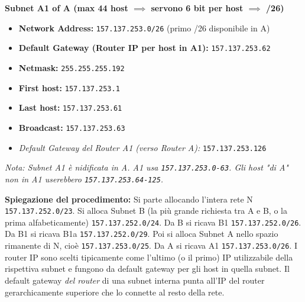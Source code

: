 \documentclass[12pt,a4paper]{article}
\newcommand{\TT}[1]{\texttt{#1}}
\begin{document}
\begin{enumerate}[label=\textbf{\arabic*.}, wide, labelindent=0pt, leftmargin=*]
    \textbf{Subnet A1 of A (max 44 host $\implies$ servono 6 bit per host $\implies$ /26)}
    \begin{itemize}[label=\textbullet]
        \item \textbf{Network Address:} \TT{157.137.253.0/26} (primo /26 disponibile in A)
        \item \textbf{Default Gateway (Router IP per host in A1):} \TT{157.137.253.62}
        \item \textbf{Netmask:} \TT{255.255.255.192}
        \item \textbf{First host:} \TT{157.137.253.1}
        \item \textbf{Last host:} \TT{157.137.253.61}
        \item \textbf{Broadcast:} \TT{157.137.253.63}
        \item \textit{Default Gateway del Router A1 (verso Router A):} \TT{157.137.253.126}
    \end{itemize}
    \textit{Nota: Subnet A1 è nidificata in A. A1 usa \TT{157.137.253.0-63}. Gli host "di A" non in A1 userebbero \TT{157.137.253.64-125}.}

    \textbf{Spiegazione del procedimento:}
    Si parte allocando l'intera rete N \TT{157.137.252.0/23}.
    Si alloca Subnet B (la più grande richiesta tra A e B, o la prima alfabeticamente) \TT{157.137.252.0/24}.
    Da B si ricava B1 \TT{157.137.252.0/26}.
    Da B1 si ricava B1a \TT{157.137.252.0/29}.
    Poi si alloca Subnet A nello spazio rimanente di N, cioè \TT{157.137.253.0/25}.
    Da A si ricava A1 \TT{157.137.253.0/26}.
    I router IP sono scelti tipicamente come l'ultimo (o il primo) IP utilizzabile della rispettiva subnet e fungono da default gateway per gli host in quella subnet. Il default gateway \textit{del router} di una subnet interna punta all'IP del router gerarchicamente superiore che lo connette al resto della rete.


\end{enumerate}
\end{document}
